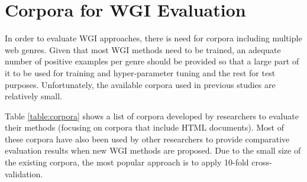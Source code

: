 


\section{Corpora for WGI Evaluation}\label{chap:relevant_work:sec:intro}

In order to evaluate WGI approaches, there is need for corpora including multiple web genres. Given that most WGI methods need to be trained, an adequate number of positive examples per genre should be provided so that a large part of it to be used for training and hyper-parameter tuning and the rest for test purposes. Unfortunately, the available corpora used in previous studies are relatively small. 

Table \ref{table:corpora} shows a list of corpora developed by researchers to evaluate their methods (focusing on corpora that include HTML documents). Most of these corpora have also been used by other researchers to provide comparative evaluation results when new WGI methods are proposed. Due to the small size of the existing corpora, the most popular approach is to apply 10-fold cross-validation.

